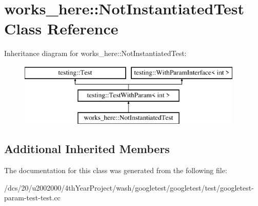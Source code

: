 \hypertarget{classworks__here_1_1NotInstantiatedTest}{}\section{works\+\_\+here\+:\+:Not\+Instantiated\+Test Class Reference}
\label{classworks__here_1_1NotInstantiatedTest}
Inheritance diagram for works\+\_\+here\+:\+:Not\+Instantiated\+Test\+:\begin{figure}[H]
\begin{center}
\leavevmode
\includegraphics[height=3.000000cm]{classworks__here_1_1NotInstantiatedTest}
\end{center}
\end{figure}
\subsection*{Additional Inherited Members}


The documentation for this class was generated from the following file\+:\begin{DoxyCompactItemize}
\item 
/dcs/20/u2002000/4th\+Year\+Project/wash/googletest/googletest/test/googletest-\/param-\/test-\/test.\+cc\end{DoxyCompactItemize}
